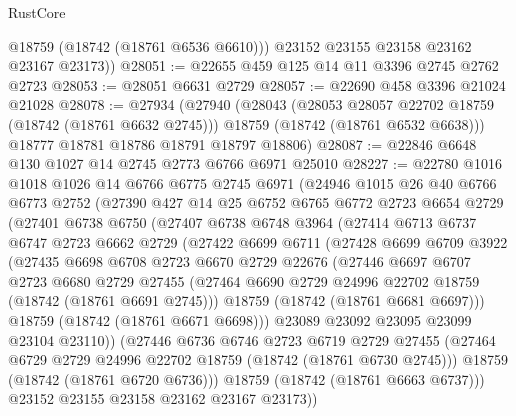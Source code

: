 \begin{lexlean}{RustCore}
\begin{coremodule}
          @18759
          (@18742 (@18761 @6536 @6610)))
        @23152
        @23155
        @23158
        @23162
        @23167
        @23173))
@28051 := @22655 @459 @125 @14 @11 @3396 @2745 @2762 @2723
@28053 := @28051 @6631 @2729
@28057 := @22690 @458 @3396 @21024 @21028
@28078 := @27934
    (@27940
      (@28043
        (@28053 @28057 @22702 @18759 (@18742 (@18761 @6632 @2745)))
        @18759
        (@18742 (@18761 @6532 @6638)))
      @18777
      @18781
      @18786
      @18791
      @18797
      @18806)
@28087 := @22846 @6648 @130 @1027 @14 @2745 @2773 @6766 @6971 @25010
@28227 := @22780
    @1016
    @1018
    @1026
    @14
    @6766
    @6775
    @2745
    @6971
    (@24946
      @1015
      @26
      @40
      @6766
      @6773
      @2752
      (@27390
        @427
        @14
        @25
        @6752
        @6765
        @6772
        @2723
        @6654
        @2729
        (@27401
          @6738
          @6750
          (@27407
            @6738
            @6748
            @3964
            (@27414
              @6713
              @6737
              @6747
              @2723
              @6662
              @2729
              (@27422
                @6699
                @6711
                (@27428
                  @6699
                  @6709
                  @3922
                  (@27435
                    @6698
                    @6708
                    @2723
                    @6670
                    @2729
                    @22676
                    (@27446
                      @6697
                      @6707
                      @2723
                      @6680
                      @2729
                      @27455
                      (@27464 @6690 @2729 @24996 @22702 @18759 (@18742 (@18761 @6691 @2745)))
                      @18759
                      (@18742 (@18761 @6681 @6697)))
                    @18759
                    (@18742 (@18761 @6671 @6698)))
                  @23089
                  @23092
                  @23095
                  @23099
                  @23104
                  @23110))
              (@27446
                @6736
                @6746
                @2723
                @6719
                @2729
                @27455
                (@27464 @6729 @2729 @24996 @22702 @18759 (@18742 (@18761 @6730 @2745)))
                @18759
                (@18742 (@18761 @6720 @6736)))
              @18759
              (@18742 (@18761 @6663 @6737)))
            @23152
            @23155
            @23158
            @23162
            @23167
            @23173))

\end{coremodule}
\end{lexlean}
